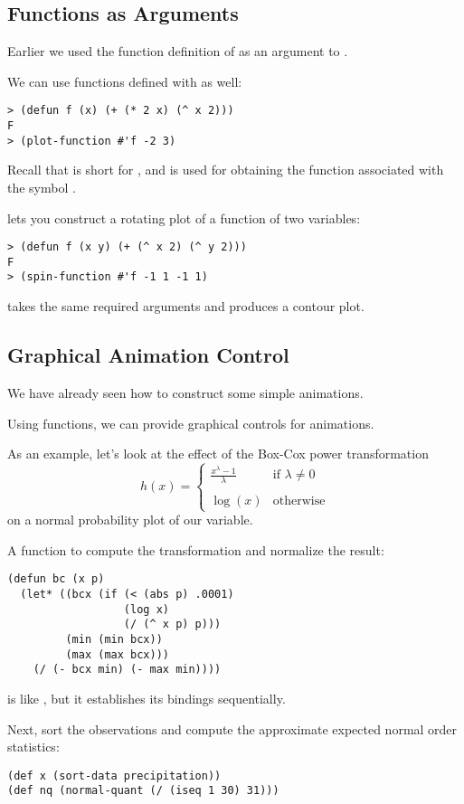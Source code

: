 \begin{slide}{}
\subsection{Functions as Arguments}
Earlier we used the function definition of  as an argument
to .

We can use functions defined with  as well:
{\Large
\begin{verbatim}
> (defun f (x) (+ (* 2 x) (^ x 2)))
F
> (plot-function #'f -2 3)
\end{verbatim}}
Recall that  is short for , and is
used for obtaining the function associated with the symbol .

 lets you construct a rotating plot of a
function of two variables:
{\Large
\begin{verbatim}
> (defun f (x y) (+ (^ x 2) (^ y 2)))
F
> (spin-function #'f -1 1 -1 1)
\end{verbatim}}
 takes the same required arguments and
produces a contour plot.
\end{slide}

\begin{slide}{}
\subsection{Graphical Animation Control}
We have already seen how to construct some simple animations.

Using functions, we can provide graphical controls for animations.

As an example, let's look at the effect of the Box-Cox power
transformation
\begin{displaymath}
h(x) = \left\{
\begin{array}{cl}
\frac{\textstyle x^{\lambda} - 1}{\textstyle \lambda}
& \mbox{if $\lambda \not= 0$}\\
\\
\log(x)
& \mbox{otherwise}
\end{array}
\right.
\end{displaymath}
on a normal probability plot of our  variable.
\end{slide}

\begin{slide}{}
A function to compute the transformation and normalize the result:
{\Large
\begin{verbatim}
(defun bc (x p)
  (let* ((bcx (if (< (abs p) .0001)
                  (log x)
                  (/ (^ x p) p)))
         (min (min bcx))
         (max (max bcx)))
    (/ (- bcx min) (- max min))))
\end{verbatim}}
 is like , but it establishes its bindings
sequentially.

Next, sort the observations and compute the approximate expected
normal order statistics:
{\Large
\begin{verbatim}
(def x (sort-data precipitation))
(def nq (normal-quant (/ (iseq 1 30) 31)))
\end{verbatim}}
\end{slide}

